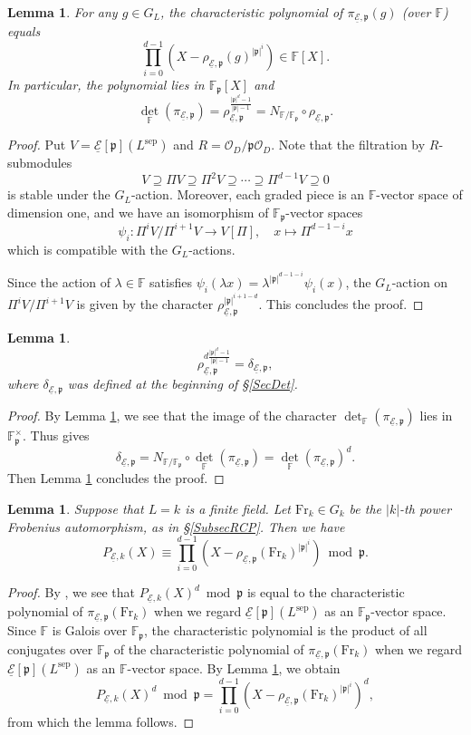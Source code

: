 \documentclass[10pt]{amsart}
\theoremstyle{plain}
\newtheorem{lem}[thm]{Lemma}
\theoremstyle{definition}
\newcommand{\Fr}{\mathrm{Fr}}
\newcommand{\sep}{\mathrm{sep}}
\newcommand{\cO}{\mathcal{O}}
\newcommand{\ucE}{\underline{\mathcal{E}}}
\newcommand{\bF}{\mathbb{F}}
\newcommand{\frp}{\mathfrak{p}}
\begin{document}
\begin{lem}\label{LemCanIsogCharNorm}
	For any $g\in G_L$, the characteristic polynomial of $\pi_{\ucE,\frp}(g)$ (over $\bF$) equals
	\[
	\prod_{i=0}^{d-1}\left(X-\rho_{\ucE,\frp}(g)^{|\frp|^i}\right)\in \bF[X].
	\]
	In particular, the polynomial lies in $\bF_\frp[X]$ and
	\[
	\det_{\bF}(\pi_{\ucE,\frp})=\rho_{\ucE,\frp}^{\frac{|\frp|^d-1}{|\frp|-1}}=N_{\bF/\bF_\frp}\circ\rho_{\ucE,\frp}.
	\]
\end{lem}
\begin{proof}
	Put $V=\ucE[\frp](L^\sep)$ and $R=\cO_D/\frp\cO_D$. 
	Note that the filtration by $R$-submodules
	\[
	V\supseteq \Pi V\supseteq \Pi^2 V\supseteq \cdots \supseteq \Pi^{d-1}V \supseteq 0
	\]
	is stable under the $G_L$-action. 
	Moreover, each graded piece is an $\bF$-vector space of dimension one, and we have an isomorphism of $\bF_\frp$-vector spaces
	\[
	\psi_i:\Pi^i V/\Pi^{i+1}V\to V[\Pi],\quad x\mapsto \Pi^{d-1-i}x
	\]
	which is compatible with the $G_L$-actions. 
	
	Since the action of $\lambda\in \bF$ satisfies $\psi_i(\lambda x)=\lambda^{|\frp|^{d-1-i}}\psi_i(x)$,
	the $G_L$-action on $\Pi^i V/\Pi^{i+1}V$ is given by the character
	$\rho_{\ucE,\frp}^{|\frp|^{i+1-d}}$. This concludes the proof.
\end{proof}

\begin{lem}\label{LemCanIsogCharDet}
	\[
	\rho_{\ucE,\frp}^{d\frac{|\frp|^d-1}{|\frp|-1}}=\delta_{\ucE,\frp},
	\]
	where $\delta_{\ucE,\frp}$ was defined at the beginning of \S\ref{SecDet}.
\end{lem}
\begin{proof}
	By Lemma \ref{LemCanIsogCharNorm}, we see that the image of the character $\det_{\bF}(\pi_{\ucE,\frp})$ lies in $\bF_\frp^\times$.
	Thus \cite[Lemma 9.20.4]{Stacks} gives
	\[
	\delta_{\ucE,\frp}=N_{\bF/\bF_\frp}\circ \det_{\bF}(\pi_{\ucE,\frp})=\det_{\bF}(\pi_{\ucE,\frp})^d.
	\]
	Then Lemma \ref{LemCanIsogCharNorm} concludes the proof.
\end{proof}

\begin{lem}\label{LemRedCharPolyModP}
	Suppose that $L=k$ is a finite field. Let $\Fr_k\in G_k$ be the $|k|$-th power Frobenius automorphism, as in \S\ref{SubsecRCP}. Then we have
	\[
	P_{\ucE,k}(X)\equiv \prod_{i=0}^{d-1} \left(X-\rho_{\ucE,\frp}(\Fr_k)^{|\frp|^i}\right) \bmod \frp.
	\]
\end{lem}
\begin{proof}
	By \cite[Theorem 9.5]{Rei}, we see that $P_{\ucE,k}(X)^d\bmod \frp$ is equal to 
	the characteristic polynomial of $\pi_{\ucE,\frp}(\Fr_k)$ when we regard $\ucE[\frp](L^\sep)$ as an $\bF_\frp$-vector
	space.
	Since $\bF$ is Galois over $\bF_\frp$, the characteristic polynomial is the product of 
	all conjugates over $\bF_\frp$ of the characteristic polynomial of $\pi_{\ucE,\frp}(\Fr_k)$ 
	when we regard $\ucE[\frp](L^\sep)$ as an $\bF$-vector
	space.
	By Lemma \ref{LemCanIsogCharNorm}, we obtain
	\[
		P_{\ucE,k}(X)^d\bmod \frp=\prod_{i=0}^{d-1}\left(X-\rho_{\ucE,\frp}(\Fr_k)^{|\frp|^i}\right)^d,
	\]
	from which the lemma follows.
\end{proof}
\end{document}
